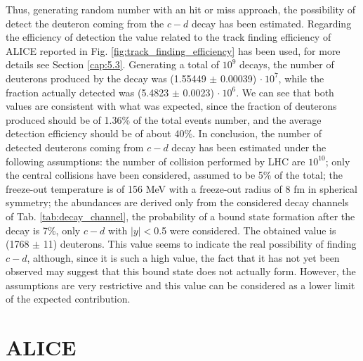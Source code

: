 \documentclass[12pt,a4paper]{book}
\begin{document}
	Thus, generating random number with an hit or miss approach, the possibility of detect the deuteron coming from the $c-d$ decay has been estimated. Regarding the efficiency of detection the value related to the track finding efficiency of ALICE reported in Fig. \ref{fig:track_finding_efficiency} has been used, for more details see Section \ref{cap:5.3}. Generating a total of $10^9$ decays, the number of deuterons produced  by the decay was (1.55449 $\pm$ 0.00039) $\cdot \ 10^7$, while the fraction actually detected was (5.4823 $\pm$ 0.0023) $\cdot \ 10^6$. We can see that both values are consistent with what was expected, since the fraction of deuterons produced should be of 1.36\% of the total events number, and the average detection efficiency should be of about 40\%. In conclusion, the number of detected deuterons coming from $c-d$ decay has been estimated under the following assumptions: the number of collision performed by LHC are $10^{10}$; only the central collisions have been considered, assumed to be 5\% of the total; the freeze-out temperature is of 156 MeV with a freeze-out radius of 8 fm in spherical symmetry; the abundances are derived only from the considered decay channels of Tab. \ref{tab:decay_channel}, the probability of a bound state formation after the decay is 7\%, only $c-d$ with $|y|<$0.5 were considered. The obtained value is (1768 $\pm$ 11) deuterons. This value seems to indicate the real possibility of finding $c-d$, although, since it is such a high value, the fact that it has not yet been observed may suggest that this bound state does not actually form. However, the assumptions are very restrictive and this value can be considered as a lower limit of the expected contribution.
	
	
	\FloatBarrier
	
	\chapter{ALICE}
	
\end{document}
